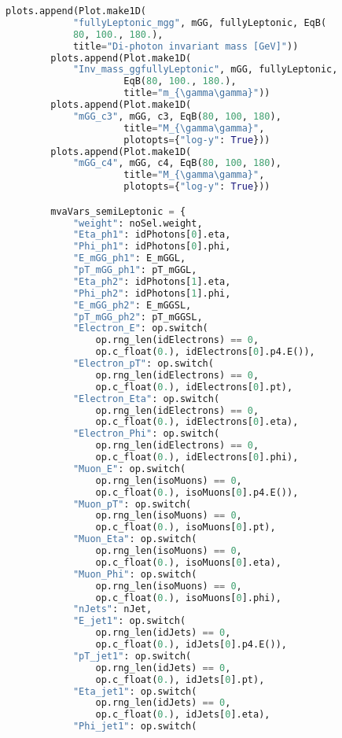 \begin{lstlisting}[language=Python, caption=Python module of the analysis used in Bamboo framework, label={bamboocode}]
        plots.append(Plot.make1D(
            "fullyLeptonic_mgg", mGG, fullyLeptonic, EqB(
            80, 100., 180.),
            title="Di-photon invariant mass [GeV]"))
        plots.append(Plot.make1D(
            "Inv_mass_ggfullyLeptonic", mGG, fullyLeptonic,
                     EqB(80, 100., 180.),
                     title="m_{\gamma\gamma}"))
        plots.append(Plot.make1D(
            "mGG_c3", mGG, c3, EqB(80, 100, 180),
                     title="M_{\gamma\gamma}",
                     plotopts={"log-y": True}))
        plots.append(Plot.make1D(
            "mGG_c4", mGG, c4, EqB(80, 100, 180),
                     title="M_{\gamma\gamma}",
                     plotopts={"log-y": True}))

        mvaVars_semiLeptonic = {
            "weight": noSel.weight,
            "Eta_ph1": idPhotons[0].eta,
            "Phi_ph1": idPhotons[0].phi,
            "E_mGG_ph1": E_mGGL,
            "pT_mGG_ph1": pT_mGGL,
            "Eta_ph2": idPhotons[1].eta,
            "Phi_ph2": idPhotons[1].phi,
            "E_mGG_ph2": E_mGGSL,
            "pT_mGG_ph2": pT_mGGSL,
            "Electron_E": op.switch(
                op.rng_len(idElectrons) == 0,
                op.c_float(0.), idElectrons[0].p4.E()),
            "Electron_pT": op.switch(
                op.rng_len(idElectrons) == 0,
                op.c_float(0.), idElectrons[0].pt),
            "Electron_Eta": op.switch(
                op.rng_len(idElectrons) == 0,
                op.c_float(0.), idElectrons[0].eta),
            "Electron_Phi": op.switch(
                op.rng_len(idElectrons) == 0,
                op.c_float(0.), idElectrons[0].phi),
            "Muon_E": op.switch(
                op.rng_len(isoMuons) == 0,
                op.c_float(0.), isoMuons[0].p4.E()),
            "Muon_pT": op.switch(
                op.rng_len(isoMuons) == 0,
                op.c_float(0.), isoMuons[0].pt),
            "Muon_Eta": op.switch(
                op.rng_len(isoMuons) == 0,
                op.c_float(0.), isoMuons[0].eta),
            "Muon_Phi": op.switch(
                op.rng_len(isoMuons) == 0,
                op.c_float(0.), isoMuons[0].phi),
            "nJets": nJet,
            "E_jet1": op.switch(
                op.rng_len(idJets) == 0,
                op.c_float(0.), idJets[0].p4.E()),
            "pT_jet1": op.switch(
                op.rng_len(idJets) == 0,
                op.c_float(0.), idJets[0].pt),
            "Eta_jet1": op.switch(
                op.rng_len(idJets) == 0,
                op.c_float(0.), idJets[0].eta),
            "Phi_jet1": op.switch(

\end{lstlisting}

